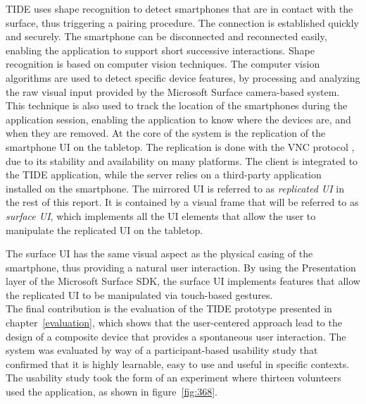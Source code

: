 TIDE uses shape recognition to detect smartphones that are in contact with the surface, thus triggering a pairing procedure.
The connection is established quickly and securely.
The smartphone can be disconnected and reconnected easily, enabling the application to support short successive interactions.
Shape recognition is based on computer vision techniques.
The computer vision algorithms are used to detect specific device features, by processing and analyzing the raw visual input provided by the Microsoft Surface camera-based system.
This technique is also used to track the location of the smartphones during the application session, enabling the application to know where the devices are, and when they are removed.
At the core of the system is the replication of the smartphone UI on the tabletop.
The replication is done with the VNC protocol \citep{Richardson:1998:vnc}, due to its stability and availability on many platforms.
The client is integrated to the TIDE application, while the server relies on a third-party application installed on the smartphone.
The mirrored UI is referred to as \emph{replicated UI} in the rest of this report.
It is contained by a visual frame that will be referred to as \emph{surface UI}, which implements all the UI elements that allow the user to manipulate the replicated UI on the tabletop.
%

The surface UI has the same visual aspect as the physical casing of the smartphone, thus providing a natural user interaction.
By using the Presentation layer of the Microsoft Surface SDK, the surface UI implements features that allow the replicated UI to be manipulated via touch-based gestures.
\\
\linebreak
The final contribution is the evaluation of the TIDE prototype presented in chapter~\ref{evaluation}, which shows that the user-centered approach lead to the design of a composite device that provides a spontaneous user interaction.
The system was evaluated by way of a participant-based usability study that confirmed that it is highly learnable, easy to use and useful in specific contexts.
The usability study took the form of an experiment where thirteen volunteers used the application, as shown in figure~\ref{fig:368}.

